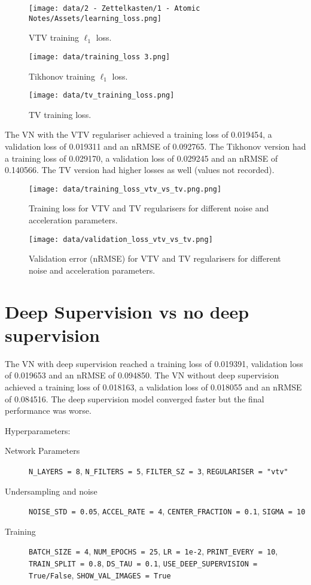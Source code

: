 \begin{figure}[h]
  \centering
  \texttt{[image: data/2 - Zettelkasten/1 - Atomic Notes/Assets/learning\_loss.png]}
  \caption{VTV training $\ell_1$ loss.}
\end{figure}

\begin{figure}[h]
  \centering
  \texttt{[image: data/training\_loss 3.png]}
  \caption{Tikhonov training $\ell_1$ loss.}
\end{figure}

\begin{figure}[h]
  \centering
  \texttt{[image: data/tv\_training\_loss.png]}
  \caption{TV training loss.}
\end{figure}

The VN with the VTV regulariser achieved a training loss of 0.019454, a validation loss of 0.019311 and an nRMSE of 0.092765. The Tikhonov version had a training loss of 0.029170, a validation loss of 0.029245 and an nRMSE of 0.140566. The TV version had higher losses as well (values not recorded).

\begin{figure}[h]
  \centering
  \texttt{[image: data/training\_loss\_vtv\_vs\_tv.png.png]}
  \caption{Training loss for VTV and TV regularisers for different noise and acceleration parameters.}
\end{figure}

\begin{figure}[h]
  \centering
  \texttt{[image: data/validation\_loss\_vtv\_vs\_tv.png]}
  \caption{Validation error (nRMSE) for VTV and TV regularisers for different noise and acceleration parameters.}
\end{figure}

\section{Deep Supervision vs no deep supervision}

The VN with deep supervision reached a training loss of 0.019391, validation loss of 0.019653 and an nRMSE of 0.094850. The VN without deep supervision achieved a training loss of 0.018163, a validation loss of 0.018055 and an nRMSE of 0.084516. The deep supervision model converged faster but the final performance was worse.

Hyperparameters:
\begin{description}
  \item[Network Parameters] \verb|N_LAYERS = 8|, \verb|N_FILTERS = 5|, \verb|FILTER_SZ = 3|, \verb|REGULARISER = "vtv"|
  \item[Undersampling and noise] \verb|NOISE_STD = 0.05|, \verb|ACCEL_RATE = 4|, \verb|CENTER_FRACTION = 0.1|, \verb|SIGMA = 10|
  \item[Training] \verb|BATCH_SIZE = 4|, \verb|NUM_EPOCHS = 25|, \verb|LR = 1e-2|, \verb|PRINT_EVERY = 10|, \verb|TRAIN_SPLIT = 0.8|, \verb|DS_TAU = 0.1|, \verb|USE_DEEP_SUPERVISION = True/False|, \verb|SHOW_VAL_IMAGES = True|
\end{description}

